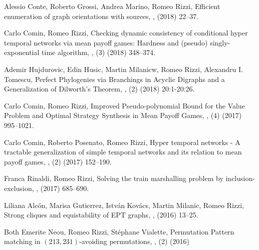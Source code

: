\begin{etaremune}
\vspace{-3.0mm}
  \item {\sc Alessio Conte, Roberto Grossi, Andrea Marino, Romeo Rizzi},
   \newblock Efficient enumeration of graph orientations with sources,
   ,
    (2018) 22--37.

  \item {\sc Carlo Comin, Romeo Rizzi},
   \newblock Checking dynamic consistency of conditional hyper temporal networks via mean payoff games: Hardness and (pseudo) singly-exponential time algorithm,
   ,
   (3) (2018) 348--374.

  \item {\sc Ademir Hujdurovic, Edin Husic, Martin Milanicw, Romeo Rizzi, Alexandru I. Tomescu},
   \newblock Perfect Phylogenies via Branchings in Acyclic Digraphs and a Generalization of Dilworth's Theorem,
   ,
   (2) (2018) 20:1-20:26.

  \item {\sc Carlo Comin, Romeo Rizzi},
   \newblock Improved Pseudo-polynomial Bound for the Value Problem and Optimal Strategy Synthesis in Mean Payoff Games,
   ,
   (4) (2017) 995--1021.

  \item {\sc Carlo Comin, Roberto Posenato, Romeo Rizzi},
   \newblock Hyper temporal networks - A tractable generalization of simple temporal networks and its relation to mean payoff games,
   ,
   (2) (2017) 152--190.

  \item {\sc Franca Rinaldi, Romeo Rizzi},
   \newblock Solving the train marshalling problem by inclusion-exclusion,
   ,
    (2017) 685--690.

  \item {\sc Liliana Alcón, Marisa Gutierrez, István Kovács, Martin Milanic, Romeo Rizzi},
   \newblock Strong cliques and equistability of EPT graphs,
   ,
    (2016) 13--25.

  \item {\sc Both Emerite Neou, Romeo Rizzi, Stéphane Vialette},
   \newblock Permutation Pattern matching in $(213, 231)$-avoiding permutations,
   ,
   (2) (2016)
   

\end{etaremune}
